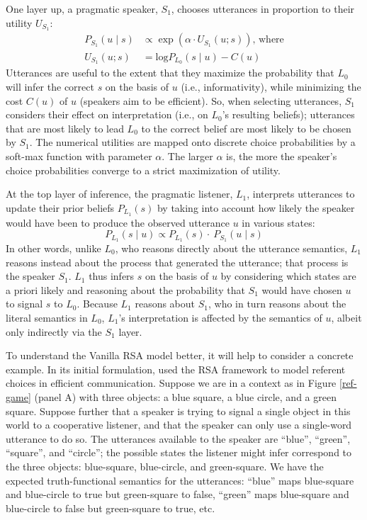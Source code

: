 \documentclass{sp}
\begin{document}
One layer up, a pragmatic speaker, $S_1$, chooses utterances in proportion to their utility $U_{S_{1}}$:
\begin{align} \label{S1}
  P_{S_1}(u \mid s) & \propto \exp (\alpha \cdot U_{S_1}(u;s))\text{, where} \\
  U_{S_1}(u; s) & = \textrm{log}P_{L_0}(s \mid u) - C(u) \nonumber
\end{align}
Utterances are useful to the extent that they maximize the probability that $L_0$ will infer the correct $s$ on the basis of $u$ (i.e., informativity), while minimizing the cost $C(u)$ of $u$ (speakers aim to be efficient). So, when selecting utterances, $S_1$ considers their effect on interpretation (i.e., on $L_0$'s resulting beliefs); utterances that are most likely to lead $L_0$ to the correct belief are most likely to be chosen by $S_1$.
The numerical utilities are mapped onto discrete choice probabilities by a soft-max function with parameter $\alpha$.
The larger $\alpha$ is, the more the speaker's choice probabilities converge to a strict maximization of utility.

At the top layer of inference, the pragmatic listener, $L_1$, interprets utterances to update their prior beliefs $P_{{L_1}}(s)$ by taking into account how likely the speaker would have been to produce the observed utterance $u$ in various states:
\begin{equation} \label{L1}
P_{L_1}(s \mid u) \propto P_{L_1}(s) \cdot \ P_{S_1}(u \mid s)
\end{equation}
In other words, unlike $L_0$, who reasons directly about the utterance semantics, $L_1$ reasons instead about the process that generated the utterance; that process is the speaker $S_1$. $L_1$ thus infers $s$ on the basis of $u$ by considering which states are a priori likely and reasoning about the probability that $S_1$ would have chosen $u$ to signal $s$ to $L_0$. Because $L_1$ reasons about $S_1$, who in turn reasons about the literal semantics in $L_0$, $L_1$'s interpretation is affected by the semantics of $u$, albeit only indirectly via the $S_1$ layer.

To understand the Vanilla RSA model better, it will help to consider a concrete example.
In its initial formulation, \cite{frankgoodman2012} used the RSA framework to model referent choices in efficient communication. Suppose we are in a context as in Figure \ref{ref-game} (panel A) with three objects: a blue square, a blue circle, and a green square. Suppose further that a speaker is trying to signal a single object in this world to a cooperative listener, and that the speaker can only use a single-word utterance to do so. The utterances available to the speaker are ``blue'', ``green'', ``square'', and ``circle''; the possible states the listener might infer correspond to the three objects: blue-square, blue-circle, and green-square. We have the expected truth-functional semantics for the utterances: ``blue'' maps blue-square and blue-circle to true but green-square to false, ``green'' maps blue-square and blue-circle to false but green-square to true, etc.
\end{document}
